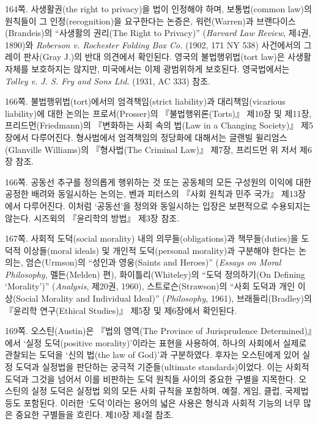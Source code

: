 {\noteentry 164쪽.  사생활권(the right to
privacy)을 법이 인정해야 하며, 보통법(common law)의 원칙들이 그
인정(recognition)을 요구한다는 논증은, 워런(Warren)과
브랜다이스(Brandeis)의 “사생활의 권리(The Right to Privacy)”
(\emph{Harvard Law Review}, 제4권, 1890)와 \emph{Roberson v. Rochester
Folding Box Co.} (1902, 171 NY 538) 사건에서의 그레이 판사(Gray J.)의
반대 의견에서 확인된다. 영국의 불법행위법(tort law)은 사생활 자체를
보호하지는 않지만, 미국에서는 이제 광범위하게 보호된다. 영국법에서는
\emph{Tolley v. J. S. Fry and Sons Ltd.} (1931, AC 333) 참조.

\noteentry 166쪽.  불법행위법(tort)에서의 엄격책임(strict liability)과 대리책임(vicarious
liability)에 대한 논의는 프로서(Prosser)의 『불법행위론(Torts)』 제10장
및 제11장, 프리드먼(Friedmann)의 『변화하는 사회 속의 법(Law in a
Changing Society)』 제5장에서 다루어진다. 형사법에서 엄격책임의 정당화에
대해서는 글랜빌 윌리엄스(Glanville Williams)의 『형사법(The Criminal
Law)』 제7장, 프리드먼 위 저서 제6장 참조.

\noteentry 166쪽.  공동선 추구를 정의롭게
행위하는 것 또는 공동체의 모든 구성원의 이익에 대한 공정한 배려와
동일시하는 논의는, 벤과 피터스의 『사회 원칙과 민주 국가』 제13장에서
다루어진다. 이처럼 ‘공동선’을 정의와 동일시하는 입장은 보편적으로
수용되지는 않는다. 시즈윅의 『윤리학의 방법』 제3장 참조.

\noteentry 167쪽.  사회적 도덕(social
morality) 내의 의무들(obligations)과 책무들(duties)을 도덕적
이상들(moral ideals) 및 개인적 도덕(personal morality)과 구분해야 한다는
논의는, 엄슨(Urmson)의 “성인과 영웅(Saints and Heroes)” (\emph{Essays
on Moral Philosophy}, 멜든(Melden) 편), 화이틀리(Whiteley)의 “도덕
정의하기(On Defining `Morality')” (\emph{Analysis}, 제20권, 1960),
스트로슨(Strawson)의 “사회 도덕과 개인 이상(Social Morality and
Individual Ideal)” (\emph{Philosophy}, 1961), 브래들리(Bradley)의
『윤리학 연구(Ethical Studies)』 제5장 및 제6장에서 확인된다.

\noteentry 169쪽.  오스틴(Austin)은 『법의 영역(The
Province of Jurisprudence Determined)』에서 ‘실정 도덕(positive
morality)’이라는 표현을 사용하여, 하나의 사회에서 실제로 관찰되는 도덕을
‘신의 법(the law of God)’과 구분하였다. 후자는 오스틴에게 있어 실정
도덕과 실정법을 판단하는 궁극적 기준들(ultimate standards)이었다. 이는
사회적 도덕과 그것을 넘어서 이를 비판하는 도덕 원칙들 사이의 중요한
구별을 지목한다. 오스틴의 실정 도덕은 실정법 외의 모든 사회 규칙을
포함하며, 예절, 게임, 클럽, 국제법 등도 포함된다. 이러한 ‘도덕’이라는
용어의 넓은 사용은 형식과 사회적 기능의 너무 많은 중요한 구별들을
흐린다. 제10장 제4절 참조.

}
